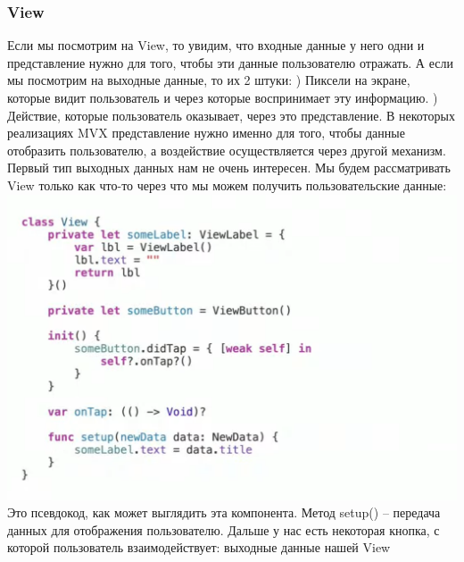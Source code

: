\documentclass{article}
\begin{document}
    \subsubsection{View}
    Если мы посмотрим на View, то увидим, что входные данные у него одни и представление нужно для того, чтобы эти данные пользователю отражать. 
    \newline
    А если мы посмотрим на выходные данные, то их 2 штуки: 
    ) Пиксели на экране, которые видит пользователь и через которые воспринимает эту информацию. 
    ) Действие, которые пользователь оказывает, через это представление. 
    \newline
    В некоторых реализациях MVX представление нужно именно для того, чтобы данные отобразить пользователю, а воздействие осуществляется через другой механизм. 
    \newline
    Первый тип выходных данных нам не очень интересен. Мы будем рассматривать View только как что-то через что мы можем получить пользовательские данные:
    \newline
    \includegraphics[scale = 0.2]{pic/Снимок экрана 2023-07-30 в 18.49.59.png}
    \newline
    Это псевдокод, как может выглядить эта компонента. Метод setup() -- передача данных для отображения пользователю. Дальше у нас есть некоторая кнопка, с которой пользователь взаимодействует: выходные данные нашей View
\end{document}
